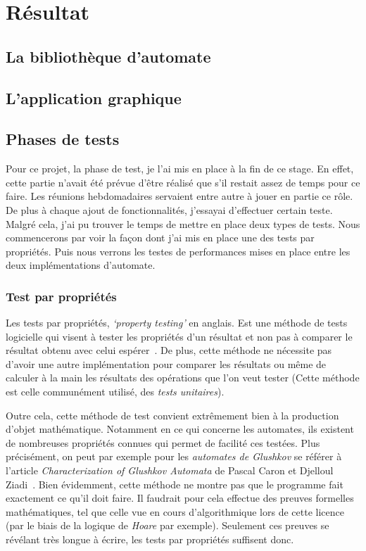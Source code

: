 \section{Résultat}

\subsection{La bibliothèque d'automate}

\subsection{L'application graphique}

\subsection{Phases de tests}

Pour ce projet, la phase de test, je l'ai mis en place à la fin de ce stage. En 
effet, cette partie n'avait été prévue d'être réalisé que s'il restait assez de 
temps pour ce faire. Les réunions hebdomadaires servaient entre autre à jouer en 
partie ce rôle. De plus à chaque ajout de fonctionnalités, j'essayai d'effectuer 
certain teste. Malgré cela, j'ai pu trouver le temps de mettre en place deux 
types de tests. Nous commencerons par voir la façon dont j'ai mis en place une 
des tests par propriétés. Puis nous verrons les testes de performances mises en 
place entre les deux implémentations d'automate.

\subsubsection{Test par propriétés}

Les tests par propriétés, \textit{`property testing'} en anglais. Est une 
méthode de tests logicielle qui visent à tester les propriétés d'un résultat et 
non pas à comparer le résultat obtenu avec celui espérer~\cite{propertyTesting}. 
De plus, cette méthode ne nécessite pas d'avoir une autre implémentation pour 
comparer les résultats ou même de calculer à la main les résultats des 
opérations que l'on veut tester (Cette méthode est celle communément utilisé, 
des \textit{tests unitaires}). 

\vphantom{}

Outre cela, cette méthode de test convient extrêmement bien à la production 
d'objet mathématique. Notamment en ce qui concerne les automates, ils existent 
de nombreuses propriétés connues qui permet de facilité ces testées. Plus 
précisément, on peut par exemple pour les \textit{automates de Glushkov} se 
référer à l'article \textit{Characterization of Glushkov Automata} de Pascal 
Caron et Djelloul Ziadi~\cite{CaronZiadi2001}. Bien évidemment, cette méthode ne
montre pas que le programme fait exactement ce qu'il doit faire. Il faudrait 
pour cela effectue des preuves formelles mathématiques, tel que celle vue en 
cours d'algorithmique lors de cette licence (par le biais de la logique de 
\textit{Hoare} par exemple). Seulement ces preuves se révélant très longue à 
écrire, les tests par propriétés suffisent donc.  

